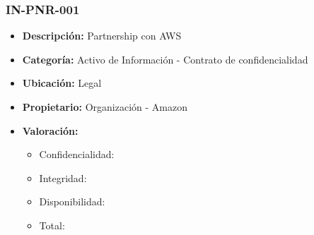 \documentclass[11pt]{utalcaDoc}
\begin{document}
\subsubsection{IN-PNR-001}
\begin{itemize}
    \item {\textbf{Descripción:}   Partnership con AWS }
    \item {\textbf{Categoría:}     Activo de Información - Contrato de confidencialidad}
    \item {\textbf{Ubicación:}     Legal }
    \item {\textbf{Propietario:}   Organización - Amazon } %
    \item {\textbf{Valoración:}
          \begin{itemize}
              \item Confidencialidad:
              \item Integridad:
              \item Disponibilidad:
              \item Total:
          \end{itemize}
          }
\end{itemize}
\end{document}
